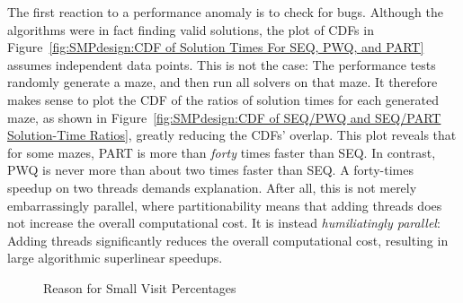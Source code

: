 The first reaction to a performance anomaly is to check for bugs.
Although the algorithms were in fact finding valid solutions, the
plot of CDFs in
Figure~\ref{fig:SMPdesign:CDF of Solution Times For SEQ, PWQ, and PART}
assumes independent data points.
This is not the case:  The performance tests randomly generate a maze,
and then run all solvers on that maze.
It therefore makes sense to plot the CDF of the ratios of
solution times for each generated maze,
as shown in
Figure~\ref{fig:SMPdesign:CDF of SEQ/PWQ and SEQ/PART Solution-Time Ratios},
greatly reducing the CDFs' overlap.
This plot reveals that for some mazes, PART
is more than \emph{forty} times faster than SEQ.
In contrast, PWQ is never more than about
two times faster than SEQ.
A forty-times speedup on two threads demands explanation.
After all, this is not merely embarrassingly parallel, where partitionability
means that adding threads does not increase the overall computational cost.
It is instead \emph{humiliatingly parallel}: Adding threads
significantly reduces the overall computational cost, resulting in
large algorithmic superlinear speedups.
\fi

\begin{figure}[tb]
\begin{center}
\end{center}
\caption{Reason for Small Visit Percentages}
\label{fig:SMPdesign:Reason for Small Visit Percentages}
\end{figure}


